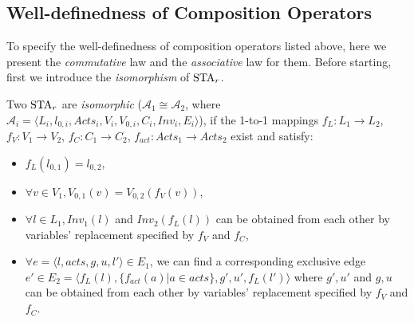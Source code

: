 % 
% 

\subsection{Well-definedness of Composition Operators}

To specify the well-definedness of composition operators listed above, here we present the \emph{commutative} law and the \emph{associative} law for them. Before starting, first we introduce the \emph{isomorphism} of $\mbox{STA}_r$.


\begin{definition}[Isomorphism]
    \label{def:isomorphism}
    Two $\mbox{STA}_r$ are \emph{isomorphic} ($\mathscr{A}_1\cong\mathscr{A}_2$, where $\mathscr{A}_{i}=\langle L_{i}, l_{0,i}, Acts_{i}, V_{i}, V_{0,i}, C_{i}, Inv_{i}, E_{i}\rangle$), if the 1-to-1 mappings $f_L:L_1\rightarrow L_2$, $f_V:V_1\rightarrow V_2$, $f_C:C_1\rightarrow C_2$, $f_{act}:Acts_1\rightarrow Acts_2$
    exist and satisfy:
    \begin{itemize}
        \item $f_L(l_{0,1}) = l_{0,2}$, 
        \item $\forall v\in V_1, V_{0,1}(v) = V_{0,2}(f_V(v))$,
        \item $\forall l\in L_1, Inv_1(l)$ and $Inv_2(f_L(l))$ can be obtained from each other by variables' replacement specified by $f_V$ and $f_C$,
        \item $\forall e=\langle l, acts, g , u, l' \rangle \in E_1$, we can find a corresponding exclusive edge $e'\in E_2 = \langle f_L(l), \{f_{act}(a)|a\in acts\}, g', u', f_L(l')\rangle$
        where $g',u'$ and $g,u$ can be obtained from each other by variables' replacement specified by $f_V$ and $f_C$.
    \end{itemize}
\end{definition}

